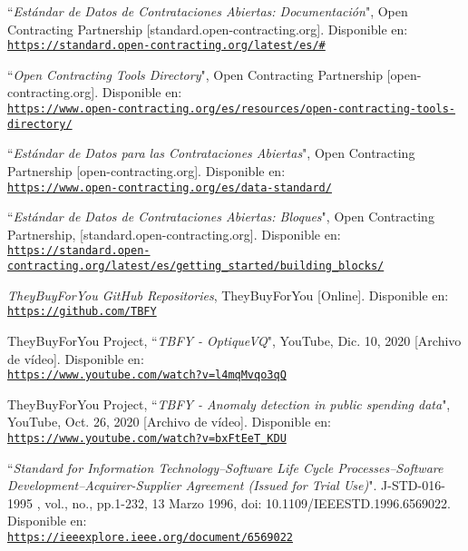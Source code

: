 \begin{thebibliography}{X}
            ``\textit{Estándar de Datos de Contrataciones Abiertas: Documentación}", Open Contracting Partnership [standard.open-contracting.org]. Disponible en:
            \\ \texttt{\url{https://standard.open-contracting.org/latest/es/\#}}
        
           ``\textit{Open Contracting Tools Directory}", Open Contracting Partnership [open-contracting.org]. Disponible en:
            \\ \texttt{\url{https://www.open-contracting.org/es/resources/open-contracting-tools-directory/}}
            
            ``\textit{Estándar de Datos para las Contrataciones Abiertas}", Open Contracting Partnership [open-contracting.org]. Disponible en:
            \\ \texttt{\url{https://www.open-contracting.org/es/data-standard/}}
            
            ``\textit{Estándar de Datos de Contrataciones Abiertas: Bloques}", Open Contracting Partnership, [standard.open-contracting.org]. Disponible en:
            \\ \texttt{\url{https://standard.open-contracting.org/latest/es/getting_started/building_blocks/}}
            
               \textit{TheyBuyForYou GitHub Repositories}, TheyBuyForYou [Online]. Disponible en:
            \\ \texttt{\url{https://github.com/TBFY}}
            
            TheyBuyForYou Project, ``\textit{TBFY - OptiqueVQ}", YouTube, Dic. 10, 2020 [Archivo de vídeo]. Disponible en:
            \\ \texttt{\url{https://www.youtube.com/watch?v=l4mqMvqo3qQ}}
            
            TheyBuyForYou Project, ``\textit{TBFY - Anomaly detection in public spending data}", YouTube, Oct. 26, 2020 [Archivo de vídeo]. Disponible en:
            \\ \texttt{\url{https://www.youtube.com/watch?v=bxFtEeT_KDU}}
    
        ``\textit{Standard for Information Technology--Software Life Cycle Processes--Software Development--Acquirer-Supplier Agreement (Issued for Trial Use)}". J-STD-016-1995 , vol., no., pp.1-232, 13 Marzo 1996, doi: 10.1109/IEEESTD.1996.6569022. Disponible en:
            \\ \texttt{\url{https://ieeexplore.ieee.org/document/6569022}}
    

\end{thebibliography}
